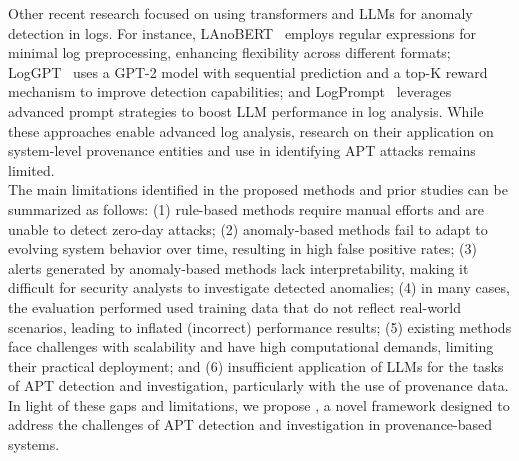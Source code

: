 \indent Other recent research focused on using transformers and LLMs for anomaly detection in logs. 
For instance, LAnoBERT~\cite{lee} employs regular expressions for minimal log preprocessing, enhancing flexibility across different formats; LogGPT~\cite{han2023loggpt} uses a GPT-2 model with sequential prediction and a top-K reward mechanism to improve detection capabilities; and LogPrompt~\cite{liu2024} leverages advanced prompt strategies to boost LLM performance in log analysis. 
While these approaches enable advanced log analysis, research on their application on system-level provenance entities and use in identifying APT attacks remains limited. \\
\indent The main limitations identified in the proposed methods and prior studies can be summarized as follows: 
(1) rule-based methods require manual efforts and are unable to detect zero-day attacks;
(2) anomaly-based methods fail to adapt to evolving system behavior over time, resulting in high false positive rates; 
(3) alerts generated by anomaly-based methods lack interpretability, making it difficult for security analysts to investigate detected anomalies;
(4) in many cases, the evaluation performed used training data that do not reflect real-world scenarios, leading to inflated (incorrect) performance results; 
(5) existing methods face challenges with scalability and have high computational demands, limiting their practical deployment; and
(6) insufficient application of LLMs for the tasks of APT detection and investigation, particularly with the use of provenance data.
In light of these gaps and limitations, we propose \method, a novel framework designed to address the challenges of APT detection and investigation in provenance-based systems.



